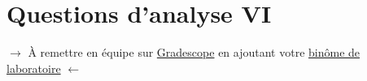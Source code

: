 \documentclass[canadien,12pt,oneside,letterpaper]{article}
\begin{document}




\section{Questions d'analyse VI} \label{sec:grade}
\vspace{-0.5cm}
\noindent$\rightarrow$ À remettre en équipe sur \href{https://www.gradescope.com/}{Gradescope} en ajoutant votre \href{https://help.gradescope.com/article/m5qz2xsnjy-student-add-group-members}{binôme de laboratoire} $\leftarrow$
\end{document}

